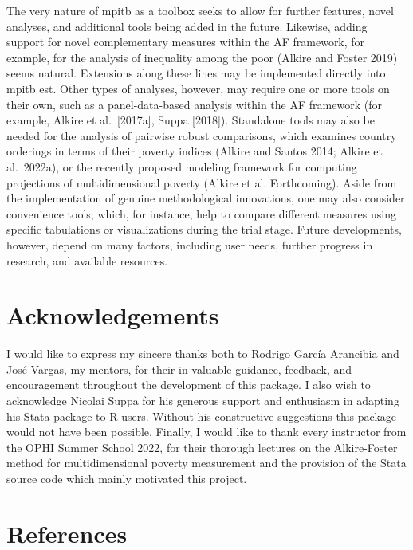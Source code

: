 The very nature of mpitb as a toolbox seeks to allow for further
features, novel analyses, and additional tools being added in the
future. Likewise, adding support for novel complementary measures within
the AF framework, for example, for the analysis of inequality among the
poor (Alkire and Foster 2019) seems natural. Extensions along these
lines may be implemented directly into mpitb est. Other types of
analyses, however, may require one or more tools on their own, such as a
panel-data-based analysis within the AF framework (for example, Alkire
et al.~{[}2017a{]}, Suppa {[}2018{]}). Standalone tools may also be needed for
the analysis of pairwise robust comparisons, which examines country
orderings in terms of their poverty indices (Alkire and Santos 2014;
Alkire et al.~2022a), or the recently proposed modeling framework for
computing projections of multidimensional poverty (Alkire et al.
Forthcoming). Aside from the implementation of genuine methodological
innovations, one may also consider convenience tools, which, for
instance, help to compare different measures using specific tabulations
or visualizations during the trial stage. Future developments, however,
depend on many factors, including user needs, further progress in
research, and available resources.

\hypertarget{acknowledgements}{%
\section{Acknowledgements}\label{acknowledgements}}

I would like to express my sincere thanks both to Rodrigo García
Arancibia and José Vargas, my mentors, for their in valuable guidance,
feedback, and encouragement throughout the development of this package.
I also wish to acknowledge Nicolai Suppa for his generous support and
enthusiasm in adapting his Stata package to R users. Without his
constructive suggestions this package would not have been possible.
Finally, I would like to thank every instructor from the OPHI Summer
School 2022, for their thorough lectures on the Alkire-Foster method for
multidimensional poverty measurement and the provision of the Stata
source code which mainly motivated this project.

\hypertarget{references}{%
\section*{References}\label{references}}

